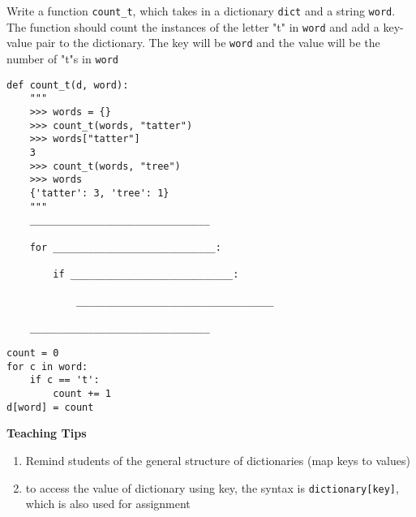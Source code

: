 \begin{blocksection}
\question Write a function \lstinline$count_t$, which takes in a dictionary \lstinline$dict$ and a string \lstinline$word$.
The function should count the instances of the letter "t" in \lstinline$word$ and add a key-value pair to the dictionary.
The key will be \lstinline$word$ and the value will be the number of "t"s in \lstinline$word$

\begin{lstlisting}
def count_t(d, word):
    """
    >>> words = {}
    >>> count_t(words, "tatter")
    >>> words["tatter"]
    3
    >>> count_t(words, "tree")
    >>> words
    {'tatter': 3, 'tree': 1}
    """
    _______________________________
    
    for ____________________________:

        if ____________________________:

            __________________________________

    _______________________________

\end{lstlisting}

\begin{solution}
\begin{lstlisting}
count = 0
for c in word:
    if c == 't':
        count += 1
d[word] = count
\end{lstlisting}
\end{solution}

\begin{blocksection}
    \begin{guide}
    \textbf{Teaching Tips}
    \begin{enumerate}
            \item Remind students of the general structure of dictionaries (map keys to values)
            \item to access the value of dictionary using key, the syntax is \lstinline$dictionary[key]$, which is also used for assignment
    \end{enumerate}
    \end{guide}
\end{blocksection}

\end{blocksection}
    
    